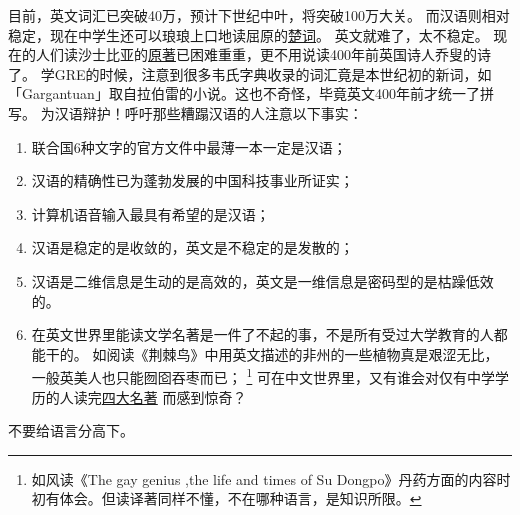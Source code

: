 \documentclass{ctexart}
\begin{document}
目前，英文词汇已突破40万，预计下世纪中叶，将突破100万大关。
而汉语则相对稳定，现在中学生还可以琅琅上口地读屈原的\underline{楚词}。
英文就难了，太不稳定。
现在的人们读沙士比亚的\underline{原著}已困难重重，更不用说读400年前英国诗人乔叟的诗了。
学GRE的时候，注意到很多韦氏字典收录的词汇竟是本世纪初的新词，如「Gargantuan」取自拉伯雷的小说。这也不奇怪，毕竟英文400年前才统一了拼写。
为汉语辩护！呼吁那些糟蹋汉语的人注意以下事实：
\begin{enumerate}[label=(\arabic*)]
\item 联合国6种文字的官方文件中最薄一本一定是汉语；
\item 汉语的精确性已为蓬勃发展的中国科技事业所证实；
\item 计算机语音输入最具有希望的是汉语；
\item 汉语是稳定的是收敛的，英文是不稳定的是发散的；
\item 汉语是二维信息是生动的是高效的，英文是一维信息是密码型的是枯躁低效的。
\item 在英文世界里能读文学名著是一件了不起的事，不是所有受过大学教育的人都能干的。
如阅读《荆棘鸟》中用英文描述的非州的一些植物真是艰涩无比，一般英美人也只能囫囵吞枣而已；
\footnote{如风读《The gay genius ,the life and times of Su Dongpo》丹药方面的内容时初有体会。但读译著同样不懂，不在哪种语言，是知识所限。}
可在中文世界里，又有谁会对仅有中学学历的人读完\underline{四大名著}
而感到惊奇？
\end{enumerate}
不要给语言分高下。
\end{document}
